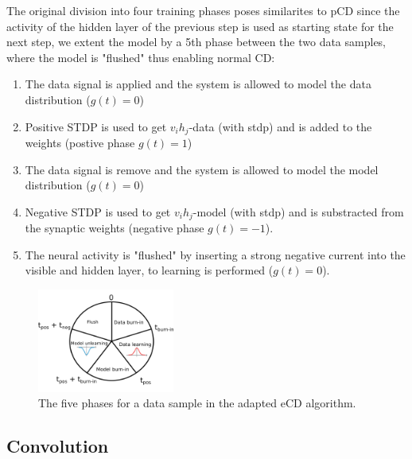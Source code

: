The original division into four training phases poses similarites to pCD since the activity of the hidden layer of the previous step is used as starting state for the next step, we extent the model by a 5th phase between the two data samples, where the model is "flushed" thus enabling normal CD:

\begin{enumerate}
\item The data signal is applied and the system is allowed to model the data distribution ($g(t)=0$)
\item Positive STDP is used to get $v_i h_j$-data (with stdp) and is added to the weights (postive phase $g(t)=1$)
\item The data signal is remove and the system is allowed to model the model distribution ($g(t)=0$)
\item Negative STDP is used to get $v_i h_j$-model (with stdp) and is substracted from the synaptic weights (negative phase $g(t)=-1$).
\item The neural activity is "flushed" by inserting a strong negative current into the visible and hidden layer, to learning is performed ($g(t)=0$).
\end{enumerate}

\begin{figure}
	\centering
    	\includegraphics[width=0.4\textwidth]{imgs/eCD_5phases.png} 
    \caption{The five phases for a data sample in the adapted eCD algorithm. }
	\label{fig:ecd5}
\end{figure}


\subsection{Convolution}

